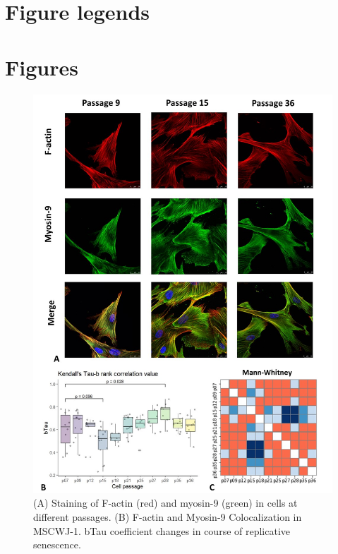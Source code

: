 \documentclass[alpha-refs]{wiley-article}
\begin{document}
\section*{Figure legends}


\section*{Figures}


\begin{figure}[hbt!]
\centering
\includegraphics[width=0.9\linewidth]{myosin-9.jpg}
\caption{(A) Staining of F-actin (red) and myosin-9 (green) in cells at different passages.
(B) F-actin and Myosin-9 Colocalization in MSCWJ-1. bTau coefficient changes in course of replicative senescence.}
\end{figure}
\end{document}
